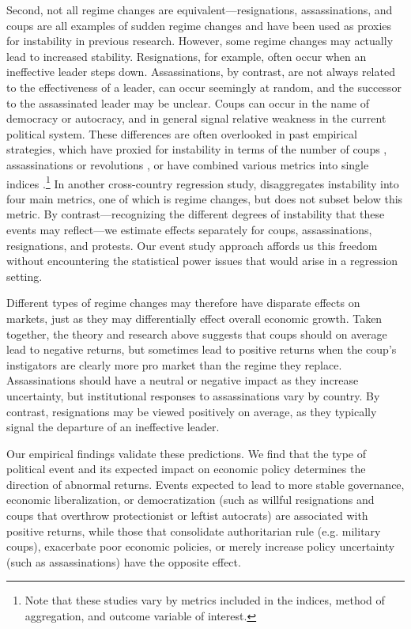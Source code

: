 \documentclass[12pt,final,fleqn]{article}
\theoremstyle{plain}
\begin{document}
Second, not all regime changes are equivalent---resignations, assassinations, and coups are all examples of sudden regime changes and have been used as proxies for instability in previous research. However, some regime changes may actually lead to increased stability. Resignations, for example, often occur when an ineffective leader steps down. Assassinations, by contrast, are not always related to the effectiveness of a leader, can occur seemingly at random, and the successor to the assassinated leader may be unclear. Coups can occur in the name of democracy or autocracy, and in general signal relative weakness in the current political system. These differences are often overlooked in past empirical strategies, which have proxied for instability in terms of the number of coups \citep{londregan1990poverty, alesina1996political}, assassinations or revolutions \citep{barro1991economic}, or have combined various metrics into single indices \citep{alesina1996income, venieris1986income, gupta1990economics}.\footnote{Note that these studies vary by metrics included in the indices, method of aggregation, and outcome variable of interest.} In another cross-country regression study, \citet{jong2009measurement} disaggregates instability into four main metrics, one of which is regime changes, but does not subset below this metric. By contrast---recognizing the different degrees of instability that these events may reflect---we estimate effects separately for coups, assassinations, resignations, and protests. Our event study approach affords us this freedom without encountering the statistical power issues that would arise in a regression setting.

Different types of regime changes may therefore have disparate effects on markets, just as they may differentially effect overall economic growth. Taken together, the theory and research above suggests that coups should on average lead to negative returns, but sometimes lead to positive returns when the coup's instigators are clearly more pro market than the regime they replace. Assassinations should have a neutral or negative impact as they increase uncertainty, but institutional responses to assassinations vary by country. By contrast, resignations may be viewed positively on average, as they typically signal the departure of an ineffective leader. 

Our empirical findings validate these predictions. We find that the type of political event and its expected impact on economic policy determines the direction of abnormal returns. Events expected to lead to more stable governance, economic liberalization, or democratization (such as willful resignations and coups that overthrow protectionist or leftist autocrats) are associated with positive returns, while those that consolidate authoritarian rule (e.g. military coups), exacerbate poor economic policies, or merely increase policy uncertainty (such as assassinations) have the opposite effect.
\end{document}
